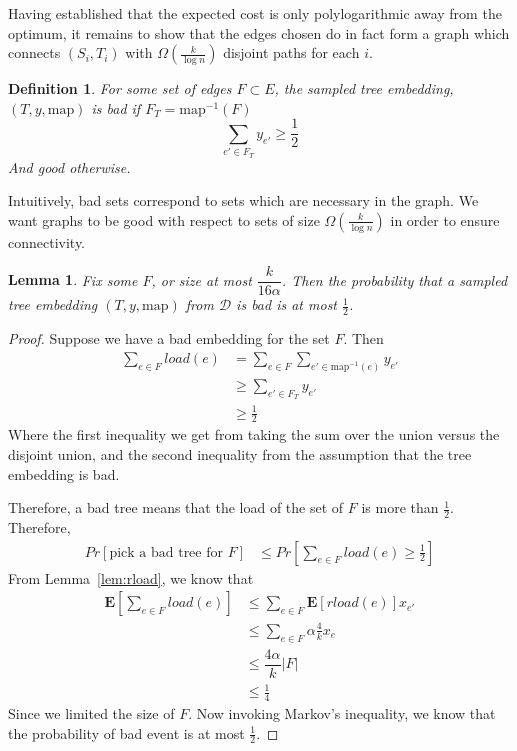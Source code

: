 \documentclass[12pt]{article}
\newtheorem{definition}{Definition}
\newtheorem{lemma}{Lemma}
\begin{document}
Having established that the expected cost is only polylogarithmic away from the optimum, it remains to show that the edges chosen do in fact form a graph which connects $(S_i, T_i)$ with $\Omega(\frac{k}{\log n})$ disjoint paths for each $i$. 

\begin{definition}
For some set of edges $F \subset E$, the sampled tree embedding, $(T, y, \text{map})$ is bad if $F_T = \text{map}^{-1}(F)$ 
\[ \sum_{e' \in F_T} y_{e'} \geq \frac{1}{2} \]
And good otherwise.
\end{definition}

Intuitively, bad sets correspond to sets which are necessary in the graph. We want graphs to be good with respect to sets of size $\Omega(\frac{k}{\log n})$ in order to ensure connectivity.

\begin{lemma}
\label{lem:notbad}
Fix some $F$, or size at most $\dfrac{k}{16 \alpha}$. Then the probability that a sampled tree embedding $(T, y, \text{map})$ from $\mathcal{D}$ is bad is at most $\frac{1}{2}$. 
\end{lemma} 

\begin{proof}
Suppose we have a bad embedding for the set $F$. Then 
\begin{align}
\sum_{e \in F} load(e)&= \sum_{e \in F} \sum_{e' \in \text{map}^{-1}(e)} y_{e'} \\
                    &\geq \sum_{e' \in F_T} y_{e'} \\
                    &\geq \frac{1}{2}
\end{align}
Where the first inequality we get from taking the sum over the union versus the disjoint union, and the second inequality from the assumption that the tree embedding is bad. 

Therefore, a bad tree means that the load of the set of $F$ is more than $\frac{1}{2}$. Therefore,
\begin{align}
Pr[\text{pick a bad tree for $F$}] &\leq Pr[ \sum_{e\in F} load(e) \geq \frac{1}{2}]
\end{align}
From Lemma~\ref{lem:rload}, we know that
\begin{align}
\textbf{E}[ \sum_{e \in F} load(e) ] &\leq \sum_{e \in F} \textbf{E}[rload(e)]x_{e'} \\
                                   & \leq \sum_{e\in F} \alpha \frac{4}{k} x_{e} \\
                                   & \leq \dfrac{4\alpha}{k} |F| \\
                                   &\leq \frac{1}{4}
\end{align}
Since we limited the size of $F$. Now invoking Markov's inequality, we know that the probability of bad event is at most $\frac{1}{2}$. 
\end{proof}
\end{document}
